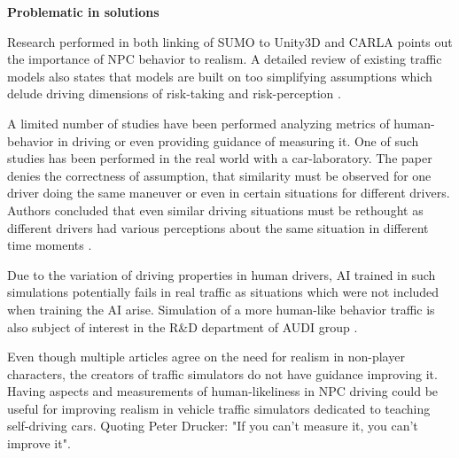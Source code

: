 \documentclass{VUMIFPS-master-intro}
\begin{document}
\textbf{Problematic in solutions}

Research performed in both linking of SUMO to Unity3D and CARLA points out the importance of NPC behavior to realism. A detailed review of existing traffic models also states that models are built on too simplifying assumptions which delude driving dimensions of risk-taking and risk-perception \cite{Eskandarian2017}.

A limited number of studies have been performed analyzing metrics of human-behavior in driving or even providing guidance of measuring it. One of such studies has been performed in the real world with a car-laboratory. The paper denies the correctness of assumption, that similarity must be observed for one driver doing the same maneuver or even in certain situations for different drivers. Authors concluded that even similar driving situations must be rethought as different drivers had various perceptions about the same situation in different time moments \cite{Blaszczyk2015}.

Due to the variation of driving properties in human drivers, AI trained in such simulations potentially fails in real traffic as situations which were not included when training the AI arise. Simulation of a more human-like behavior traffic is also subject of interest in the R\&D department of AUDI group \cite{AUDI2018}.

Even though multiple articles agree on the need for realism in non-player characters, the creators of traffic simulators do not have guidance improving it. Having aspects and measurements of human-likeliness in NPC driving could be useful for improving realism in vehicle traffic simulators dedicated to teaching self-driving cars. Quoting Peter Drucker: "If you can't measure it, you can't improve it".


\end{document}
